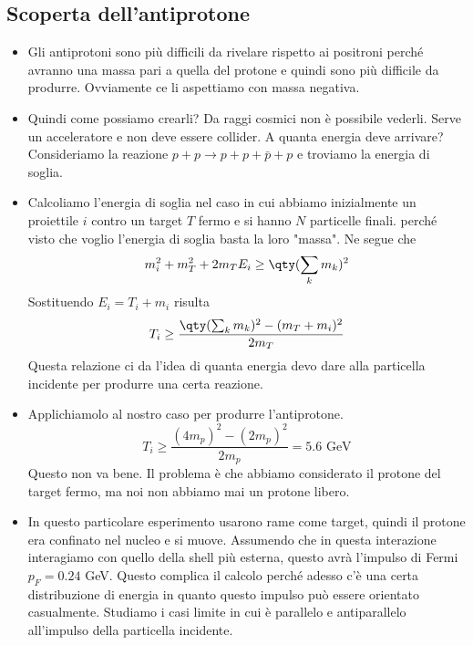 \subsection{Scoperta dell'antiprotone}
\begin{itemize}
    \item Gli antiprotoni sono più difficili da rivelare rispetto ai positroni perché avranno una massa pari a quella del protone e quindi sono più difficile da produrre. Ovviamente ce li aspettiamo con massa negativa.
    \item Quindi come possiamo crearli? Da raggi cosmici non è possibile vederli. Serve un acceleratore e non deve essere collider. A quanta energia deve arrivare? Consideriamo la reazione $p+p\to p+p+\bar p+p$ e troviamo la energia di soglia.
    \item Calcoliamo l'energia di soglia nel caso in cui abbiamo inizialmente un proiettile $i$ contro un target $T$ fermo e si hanno $N$ particelle finali.
    perché visto che voglio l'energia di soglia basta la loro "massa". Ne segue che 
    \begin{equation*}
    m_i^2+m_T^2+2m_TE_i\geq\qty(\sum_km_k)^2
    \end{equation*}
    Sostituendo $E_i=T_i+m_i$ risulta
    \begin{equation*}
    T_i\geq\frac{\qty(\sum_km_k)^2-(m_T+m_i)^2 } {2m_T}
    \end{equation*}
    Questa relazione ci da l'idea di quanta energia devo dare alla particella incidente per produrre una certa reazione.
    \item Applichiamolo al nostro caso per produrre l'antiprotone.
    \begin{equation*}
    T_i\geq\frac{(4m_p)^2-(2m_p)^2}{2m_p}=5.6\text{ GeV}
    \end{equation*}
    Questo non va bene. Il problema è che abbiamo considerato il protone del target fermo, ma noi non abbiamo mai un protone libero.
    \item In questo particolare esperimento usarono rame come target, quindi il protone era confinato nel nucleo e si muove. Assumendo che in questa interazione interagiamo con quello della shell più esterna, questo avrà l'impulso di Fermi $p_F=0.24$ GeV. Questo complica il calcolo perché adesso c'è una certa distribuzione di energia in quanto questo impulso può essere orientato casualmente. Studiamo i casi limite in cui è parallelo e antiparallelo all'impulso della particella incidente.

\end{itemize}
